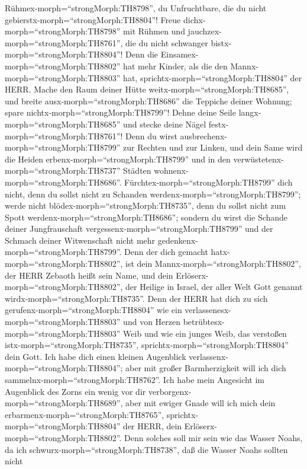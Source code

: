  Rühmex-morph=``strongMorph:TH8798'', du Unfruchtbare, die
du nicht gebierstx-morph=``strongMorph:TH8804''! Freue
dichx-morph=``strongMorph:TH8798'' mit Rühmen und
jauchzex-morph=``strongMorph:TH8761'', die du nicht schwanger
bistx-morph=``strongMorph:TH8804''! Denn die
Einsamex-morph=``strongMorph:TH8802'' hat mehr Kinder, als die den
Mannx-morph=``strongMorph:TH8803'' hat,
sprichtx-morph=``strongMorph:TH8804'' der HERR.  Mache den
Raum deiner Hütte weitx-morph=``strongMorph:TH8685'', und breite
ausx-morph=``strongMorph:TH8686'' die Teppiche deiner Wohnung; spare
nichtx-morph=``strongMorph:TH8799''! Dehne deine Seile
langx-morph=``strongMorph:TH8685'' und stecke deine Nägel
festx-morph=``strongMorph:TH8761''!  Denn du wirst
ausbrechenx-morph=``strongMorph:TH8799'' zur Rechten und zur Linken, und
dein Same wird die Heiden erbenx-morph=``strongMorph:TH8799'' und in den
verwüstetenx-morph=``strongMorph:TH8737'' Städten
wohnenx-morph=``strongMorph:TH8686''. 
Fürchtex-morph=``strongMorph:TH8799'' dich nicht, denn du sollst nicht
zu Schanden werdenx-morph=``strongMorph:TH8799''; werde nicht
blödex-morph=``strongMorph:TH8735'', denn du sollst nicht zum Spott
werdenx-morph=``strongMorph:TH8686''; sondern du wirst die Schande
deiner Jungfrauschaft vergessenx-morph=``strongMorph:TH8799'' und der
Schmach deiner Witwenschaft nicht mehr
gedenkenx-morph=``strongMorph:TH8799''.  Denn der dich
gemacht hatx-morph=``strongMorph:TH8802'', ist dein
Mannx-morph=``strongMorph:TH8802'', der HERR Zebaoth heißt sein Name,
und dein Erlöserx-morph=``strongMorph:TH8802'', der Heilige in Israel,
der aller Welt Gott genannt wirdx-morph=``strongMorph:TH8735''.
 Denn der HERR hat dich zu sich
gerufenx-morph=``strongMorph:TH8804'' wie ein
verlassenesx-morph=``strongMorph:TH8803'' und von Herzen
betrübtesx-morph=``strongMorph:TH8803'' Weib und wie ein junges Weib,
das verstoßen istx-morph=``strongMorph:TH8735'',
sprichtx-morph=``strongMorph:TH8804'' dein Gott.  Ich habe
dich einen kleinen Augenblick verlassenx-morph=``strongMorph:TH8804'';
aber mit großer Barmherzigkeit will ich dich
sammelnx-morph=``strongMorph:TH8762''.  Ich habe mein
Angesicht im Augenblick des Zorns ein wenig vor dir
verborgenx-morph=``strongMorph:TH8689'', aber mit ewiger Gnade will ich
mich dein erbarmenx-morph=``strongMorph:TH8765'',
sprichtx-morph=``strongMorph:TH8804'' der HERR, dein
Erlöserx-morph=``strongMorph:TH8802''.  Denn solches soll
mir sein wie das Wasser Noahs, da ich
schwurx-morph=``strongMorph:TH8738'', daß die Wasser Noahs sollten nicht
